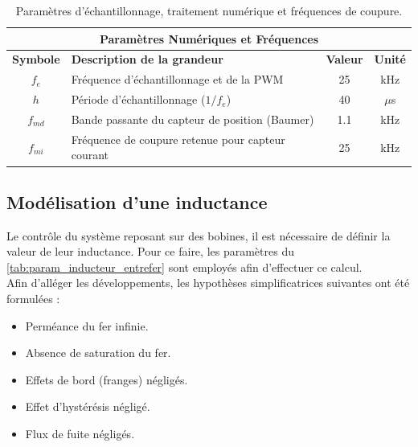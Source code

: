 \begin{table}[H]
    \centering
    \renewcommand{\arraystretch}{1.2}
    \begin{tabular}{|c|l|c|c|}
        \hline
        \multicolumn{4}{|c|}{\textbf{Paramètres Numériques et Fréquences}}                                      \\ \hline
        \textbf{Symbole} & \textbf{Description de la grandeur}               & \textbf{Valeur} & \textbf{Unité} \\ \hline
        $f_e$            & Fréquence d'échantillonnage et de la PWM          & 25              & kHz            \\ \hline
        $h$              & Période d'échantillonnage ($1 / f_e$)             & 40              & $\mu$s         \\ \hline
        $f_{md}$         & Bande passante du capteur de position (Baumer)    & 1.1             & kHz            \\ \hline
        $f_{mi}$         & Fréquence de coupure retenue pour capteur courant & 25              & kHz            \\ \hline
    \end{tabular}
    \caption{Paramètres d'échantillonnage, traitement numérique et fréquences de coupure.}
    \label{tab:param_numeriques_frequences}
\end{table}

\subsection{Modélisation d'une inductance}
Le contrôle du système reposant sur des bobines, il est nécessaire de définir la valeur de leur inductance. Pour ce faire, les paramètres du \autoref{tab:param_inducteur_entrefer} sont employés afin d'effectuer ce calcul.\\

Afin d'alléger les développements, les hypothèses simplificatrices suivantes ont été formulées :
\begin{itemize}
    \item Perméance du fer infinie.
    \item Absence de saturation du fer.
    \item Effets de bord (franges) négligés.
    \item Effet d’hystérésis négligé.
    \item Flux de fuite négligés.
\end{itemize}

